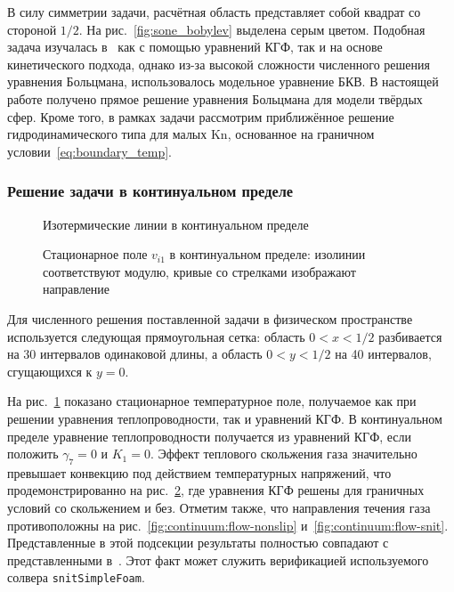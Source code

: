 \documentclass[
aps,%
12pt,%
final,%
notitlepage,%
oneside,%
onecolumn,%
nobibnotes,%
nofootinbib,%
superscriptaddress,%
noshowpacs,%
centertags]%
{revtex4}
\newcommand{\Kn}{\mathrm{Kn}}
\begin{document}
В силу симметрии задачи, расчётная область представляет собой квадрат со стороной \(1/2\).
На рис.~\ref{fig:sone_bobylev} выделена серым цветом.
Подобная задача изучалась в~\cite{Sone1996} как с помощью уравнений КГФ, так и на основе кинетического подхода,
однако из-за высокой сложности численного решения уравнения Больцмана, использовалось модельное уравнение БКВ.
В настоящей работе получено прямое решение уравнения Больцмана для модели твёрдых сфер.
Кроме того, в рамках задачи рассмотрим приближённое решение гидродинамического типа для малых \(\Kn\),
основанное на граничном условии~\eqref{eq:boundary_temp}.

\subsubsection{Решение задачи в континуальном пределе}

\begin{figure}
    \caption{Изотермические линии в континуальном пределе}
    \label{fig:continuum:temp}
\end{figure}

\begin{figure}
    \centering
    \caption{Стационарное поле \(v_{i1}\) в континуальном пределе:
        изолинии соответствуют модулю, кривые со стрелками изображают направление}
    \label{fig:continuum:flow}
\end{figure}

Для численного решения поставленной задачи в физическом пространстве
используется следующая прямоугольная сетка:
область \(0<x<1/2\) разбивается на 30 интервалов одинаковой длины,
а область \(0<y<1/2\) на 40 интервалов, сгущающихся к \(y=0\).

На рис.~\ref{fig:continuum:temp} показано стационарное температурное поле,
получаемое как при решении уравнения теплопроводности, так и уравнений КГФ.
В континуальном пределе уравнение теплопроводности получается из уравнений КГФ,
если положить \(\gamma_7=0\) и \(K_1=0\).
Эффект теплового скольжения газа значительно превышает конвекцию под действием температурных напряжений,
что продемонстрированно на рис.~\ref{fig:continuum:flow}, где уравнения КГФ решены
для граничных условий со скольжением и без.
Отметим также, что направления течения газа противоположны на рис.~\ref{fig:continuum:flow-nonslip}
и~\ref{fig:continuum:flow-snit}.
Представленные в этой подсекции результаты полностью совпадают с представленными в~\cite{Sone1996}.
Этот факт может служить верификацией используемого солвера \verb+snitSimpleFoam+.
\end{document}
